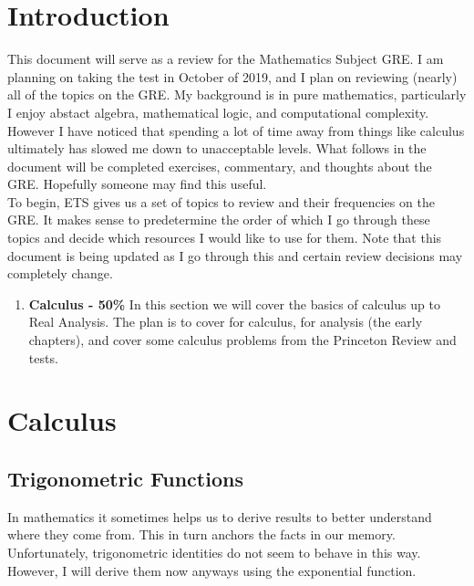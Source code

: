 
\def\name{Daniel Tobias}
\def\assignment{Mathematics GRE Review}
\usepackage{hyperref}

\section{Introduction}
This document will serve as a review for the Mathematics Subject GRE. I am planning on taking the test in October of 2019, and I plan on reviewing (nearly) all of the topics on the GRE. My background is in pure mathematics, particularly I enjoy abstact algebra, mathematical logic, and computational complexity. However I have noticed that spending a lot of time away from things like calculus ultimately has slowed me down to unacceptable levels. What follows in the document will be completed exercises, commentary, and thoughts about the GRE. Hopefully someone may find this useful.\\

To begin, ETS gives us a set of topics to review and their frequencies on the GRE. It makes sense to predetermine the order of which I go through these topics and decide which resources I would like to use for them. Note that this document is being updated as I go through this and certain review decisions may completely change.

\begin{enumerate}
	\item \textbf{Calculus - 50\%} In this section we will cover the basics of calculus up to Real Analysis. The plan is to cover \cite{Stewart} for calculus, \cite{Rudin} for analysis (the early chapters), and cover some calculus problems from the Princeton Review and \cite{UC} tests.
\end{enumerate}

\section{Calculus}
\subsection{Trigonometric Functions}
In mathematics it sometimes helps us to derive results to better understand where they come from. This in turn anchors the facts in our memory. Unfortunately, trigonometric identities do not seem to behave in this way. However, I will derive them now anyways using the exponential function.
